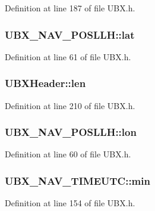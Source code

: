 Definition at line 187 of file U\-B\-X.\-h.

\hypertarget{group___g_s_p_module_ga41a8c2e9da88805da15971d21c633f6f}{
\subsubsection[{lat}]{ U\-B\-X\-\_\-\-N\-A\-V\-\_\-\-P\-O\-S\-L\-L\-H\-::lat}}\label{group___g_s_p_module_ga41a8c2e9da88805da15971d21c633f6f}


Definition at line 61 of file U\-B\-X.\-h.

\hypertarget{group___g_s_p_module_gac3357d02e8f968e15c24c81716054a85}{
\subsubsection[{len}]{ U\-B\-X\-Header\-::len}}\label{group___g_s_p_module_gac3357d02e8f968e15c24c81716054a85}


Definition at line 210 of file U\-B\-X.\-h.

\hypertarget{group___g_s_p_module_ga754c2e4fe17d3fc6b627416bc1ff2110}{
\subsubsection[{lon}]{ U\-B\-X\-\_\-\-N\-A\-V\-\_\-\-P\-O\-S\-L\-L\-H\-::lon}}\label{group___g_s_p_module_ga754c2e4fe17d3fc6b627416bc1ff2110}


Definition at line 60 of file U\-B\-X.\-h.

\hypertarget{group___g_s_p_module_gacd6195ae28168d6d82b8944dd362a976}{
\subsubsection[{min}]{ U\-B\-X\-\_\-\-N\-A\-V\-\_\-\-T\-I\-M\-E\-U\-T\-C\-::min}}\label{group___g_s_p_module_gacd6195ae28168d6d82b8944dd362a976}


Definition at line 154 of file U\-B\-X.\-h.

